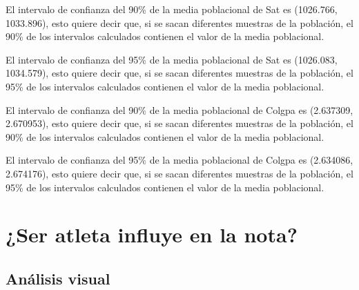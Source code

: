 \documentclass[
]{article}
\newenvironment{Shaded}{\begin{snugshade}}{\end{snugshade}}
\newcommand{\AttributeTok}[1]{\textcolor[rgb]{0.80,0.80,0.80}{#1}}
\newcommand{\ConstantTok}[1]{\textcolor[rgb]{0.86,0.64,0.64}{\textbf{#1}}}
\newcommand{\FunctionTok}[1]{\textcolor[rgb]{0.94,0.94,0.56}{#1}}
\newcommand{\NormalTok}[1]{\textcolor[rgb]{0.80,0.80,0.80}{#1}}
\newcommand{\OtherTok}[1]{\textcolor[rgb]{0.94,0.94,0.56}{#1}}
\newcommand{\SpecialCharTok}[1]{\textcolor[rgb]{0.86,0.64,0.64}{#1}}
\newcommand{\StringTok}[1]{\textcolor[rgb]{0.80,0.58,0.58}{#1}}
\begin{document}
El intervalo de confianza del 90\% de la media poblacional de Sat es
(1026.766, 1033.896), esto quiere decir que, si se sacan diferentes
muestras de la población, el 90\% de los intervalos calculados contienen
el valor de la media poblacional.

El intervalo de confianza del 95\% de la media poblacional de Sat es
(1026.083, 1034.579), esto quiere decir que, si se sacan diferentes
muestras de la población, el 95\% de los intervalos calculados contienen
el valor de la media poblacional.

El intervalo de confianza del 90\% de la media poblacional de Colgpa es
(2.637309, 2.670953), esto quiere decir que, si se sacan diferentes
muestras de la población, el 90\% de los intervalos calculados contienen
el valor de la media poblacional.

El intervalo de confianza del 95\% de la media poblacional de Colgpa es
(2.634086, 2.674176), esto quiere decir que, si se sacan diferentes
muestras de la población, el 95\% de los intervalos calculados contienen
el valor de la media poblacional.

\hypertarget{ser-atleta-influye-en-la-nota}{%
\section{¿Ser atleta influye en la
nota?}\label{ser-atleta-influye-en-la-nota}}

\hypertarget{anuxe1lisis-visual}{%
\subsection{Análisis visual}\label{anuxe1lisis-visual}}

\begin{Shaded}
\end{Shaded}
\end{document}
